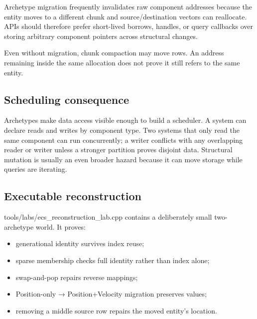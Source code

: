 Archetype migration frequently invalidates raw component addresses because the entity moves to a different chunk and source/destination vectors can reallocate. APIs should therefore prefer short-lived borrows, handles, or query callbacks over storing arbitrary component pointers across structural changes.

Even without migration, chunk compaction may move rows. An address remaining inside the same allocation does not prove it still refers to the same entity.

\subsection{Scheduling consequence}\label{appendix-fbfeb0430008-scheduling-consequence}

\hypertarget{appendix-fbfeb0430008-scheduling-consequence}{}

Archetypes make data access visible enough to build a scheduler. A system can declare reads and writes by component type. Two systems that only read the same component can run concurrently; a writer conflicts with any overlapping reader or writer unless a stronger partition proves disjoint data. Structural mutation is usually an even broader hazard because it can move storage while queries are iterating.

\subsection{Executable reconstruction}\label{appendix-fbfeb0430008-executable-reconstruction}

\hypertarget{appendix-fbfeb0430008-executable-reconstruction}{}

tools/labs/ecs\_reconstruction\_lab.cpp contains a deliberately small two-archetype world. It proves:

\begin{itemize}
\tightlist
\item
  generational identity survives index reuse;
\item
  sparse membership checks full identity rather than index alone;
\item
  swap-and-pop repairs reverse mappings;
\item
  Position-only → Position+Velocity migration preserves values;
\item
  removing a middle source row repairs the moved entity's location.
\end{itemize}

